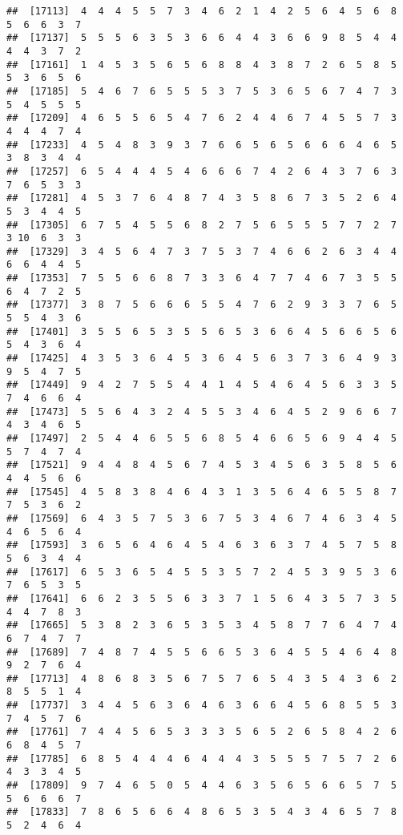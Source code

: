\documentclass[
]{book}
\begin{document}
\begin{verbatim}
##  [17113]  4  4  4  5  5  7  3  4  6  2  1  4  2  5  6  4  5  6  8  5  6  6  3  7
##  [17137]  5  5  5  6  3  5  3  6  6  4  4  3  6  6  9  8  5  4  4  4  4  3  7  2
##  [17161]  1  4  5  3  5  6  5  6  8  8  4  3  8  7  2  6  5  8  5  5  3  6  5  6
##  [17185]  5  4  6  7  6  5  5  5  3  7  5  3  6  5  6  7  4  7  3  5  4  5  5  5
##  [17209]  4  6  5  5  6  5  4  7  6  2  4  4  6  7  4  5  5  7  3  4  4  4  7  4
##  [17233]  4  5  4  8  3  9  3  7  6  6  5  6  5  6  6  6  4  6  5  3  8  3  4  4
##  [17257]  6  5  4  4  4  5  4  6  6  6  7  4  2  6  4  3  7  6  3  7  6  5  3  3
##  [17281]  4  5  3  7  6  4  8  7  4  3  5  8  6  7  3  5  2  6  4  5  3  4  4  5
##  [17305]  6  7  5  4  5  5  6  8  2  7  5  6  5  5  5  7  7  2  7  3 10  6  3  3
##  [17329]  3  4  5  6  4  7  3  7  5  3  7  4  6  6  2  6  3  4  4  6  6  4  4  5
##  [17353]  7  5  5  6  6  8  7  3  3  6  4  7  7  4  6  7  3  5  5  6  4  7  2  5
##  [17377]  3  8  7  5  6  6  6  5  5  4  7  6  2  9  3  3  7  6  5  5  5  4  3  6
##  [17401]  3  5  5  6  5  3  5  5  6  5  3  6  6  4  5  6  6  5  6  5  4  3  6  4
##  [17425]  4  3  5  3  6  4  5  3  6  4  5  6  3  7  3  6  4  9  3  9  5  4  7  5
##  [17449]  9  4  2  7  5  5  4  4  1  4  5  4  6  4  5  6  3  3  5  7  4  6  6  4
##  [17473]  5  5  6  4  3  2  4  5  5  3  4  6  4  5  2  9  6  6  7  4  3  4  6  5
##  [17497]  2  5  4  4  6  5  5  6  8  5  4  6  6  5  6  9  4  4  5  5  7  4  7  4
##  [17521]  9  4  4  8  4  5  6  7  4  5  3  4  5  6  3  5  8  5  6  4  4  5  6  6
##  [17545]  4  5  8  3  8  4  6  4  3  1  3  5  6  4  6  5  5  8  7  7  5  3  6  2
##  [17569]  6  4  3  5  7  5  3  6  7  5  3  4  6  7  4  6  3  4  5  4  6  5  6  4
##  [17593]  3  6  5  6  4  6  4  5  4  6  3  6  3  7  4  5  7  5  8  5  6  3  4  4
##  [17617]  6  5  3  6  5  4  5  5  3  5  7  2  4  5  3  9  5  3  6  7  6  5  3  5
##  [17641]  6  6  2  3  5  5  6  3  3  7  1  5  6  4  3  5  7  3  5  4  4  7  8  3
##  [17665]  5  3  8  2  3  6  5  3  5  3  4  5  8  7  7  6  4  7  4  6  7  4  7  7
##  [17689]  7  4  8  7  4  5  5  6  6  5  3  6  4  5  5  4  6  4  8  9  2  7  6  4
##  [17713]  4  8  6  8  3  5  6  7  5  7  6  5  4  3  5  4  3  6  2  8  5  5  1  4
##  [17737]  3  4  4  5  6  3  6  4  6  3  6  6  4  5  6  8  5  5  3  7  4  5  7  6
##  [17761]  7  4  4  5  6  5  3  3  3  5  6  5  2  6  5  8  4  2  6  6  8  4  5  7
##  [17785]  6  8  5  4  4  4  6  4  4  4  3  5  5  5  7  5  7  2  6  4  3  3  4  5
##  [17809]  9  7  4  6  5  0  5  4  4  6  3  5  6  5  6  6  5  7  5  5  6  6  6  7
##  [17833]  7  8  6  5  6  6  4  8  6  5  3  5  4  3  4  6  5  7  8  5  2  4  6  4

\end{verbatim}
\end{document}
